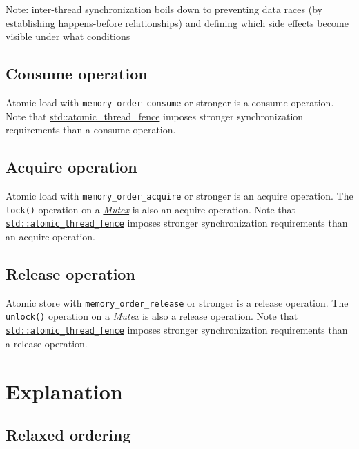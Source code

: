 \documentclass[a4paper,12pt,notitlepage,twoside,openright]{article}
\begin{document}
Note: inter-thread synchronization boils down to preventing data races
(by establishing happens-before relationships) and defining which side
effects become visible under what conditions

\hypertarget{consume-operation}{%
\subsection{Consume operation}\label{consume-operation}}

Atomic load with \texttt{memory\_order\_consume} or stronger is a consume
operation. Note that
\href{https://en.cppreference.com/w/cpp/atomic/atomic_thread_fence}{std::atomic\_thread\_fence}
imposes stronger synchronization requirements than a consume operation.

\hypertarget{acquire-operation}{%
\subsection{Acquire operation}\label{acquire-operation}}

Atomic load with \texttt{memory\_order\_acquire} or stronger is an acquire
operation. The \texttt{lock()} operation on a
\href{https://en.cppreference.com/w/cpp/named_req/Mutex}{\emph{Mutex}}
is also an acquire operation. Note that
\href{https://en.cppreference.com/w/cpp/atomic/atomic_thread_fence}{\texttt{std::atomic\_thread\_fence}}
imposes stronger synchronization requirements than an acquire operation.

\hypertarget{release-operation}{%
\subsection{Release operation}\label{release-operation}}

Atomic store with \texttt{memory\_order\_release} or stronger is a release
operation. The \texttt{unlock()} operation on a
\href{https://en.cppreference.com/w/cpp/named_req/Mutex}{\emph{Mutex}}
is also a release operation. Note that
\href{https://en.cppreference.com/w/cpp/atomic/atomic_thread_fence}{\texttt{std::atomic\_thread\_fence}}
imposes stronger synchronization requirements than a release operation.

\hypertarget{explanation}{%
\section{Explanation}\label{explanation}}

\hypertarget{relaxed-ordering}{%
\subsection{Relaxed ordering}\label{relaxed-ordering}}
\end{document}
